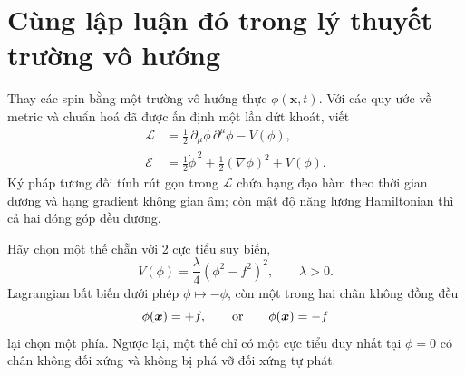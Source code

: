 \begin{classroomqa}
\end{classroomqa}

\begin{classroomqa}
\end{classroomqa}

\section{Cùng lập luận đó trong lý thuyết trường vô hướng}

Thay các spin bằng một trường vô hướng thực \(\phi(\bm{x},t)\). Với các quy ước về metric và chuẩn hoá đã được ấn định một lần dứt khoát, viết
\begin{equation}
\begin{aligned}
  \mathcal L
  &=\frac12\,\partial_\mu\phi\,\partial^\mu\phi-V(\phi),
  \\
  \mathcal E
  &=\frac12\dot\phi^{\,2}+\frac12(\nabla\phi)^2+V(\phi).
\end{aligned}
  \label{eq:l07-real-scalar}
\end{equation}
Ký pháp tương đối tính rút gọn trong \(\mathcal L\) chứa hạng đạo hàm theo thời gian dương và hạng gradient không gian âm; còn mật độ năng lượng Hamiltonian thì cả hai đóng góp đều dương.

Hãy chọn một thế chẵn với 2 cực tiểu suy biến,
\begin{equation}
  V(\phi)=\frac{\lambda}{4}\left(\phi^2-f^2\right)^2,
  \qquad \lambda>0.
  \label{eq:l07-double-well}
\end{equation}
Lagrangian bất biến dưới phép \(\phi\mapsto-\phi\), còn một trong hai chân không đồng đều
\begin{equation}
  \phi(\bm{x})=+f,
  \qquad\hbox{or}\qquad
  \phi(\bm{x})=-f
\end{equation}
lại chọn một phía. Ngược lại, một thế chỉ có một cực tiểu duy nhất tại \(\phi=0\) có chân không đối xứng và không bị phá vỡ đối xứng tự phát.

